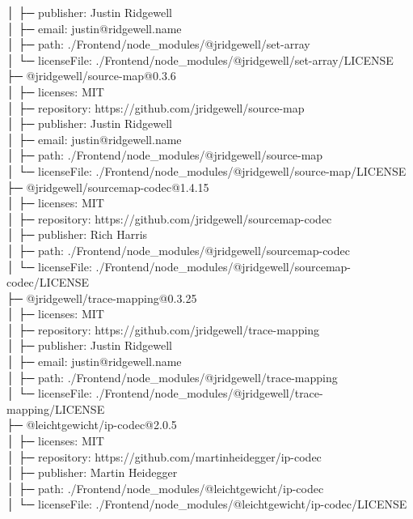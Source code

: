 │  ├─ publisher: Justin Ridgewell\\
│  ├─ email: justin@ridgewell.name\\
│  ├─ path: ./Frontend/node\_modules/@jridgewell/set-array\\
│  └─ licenseFile: ./Frontend/node\_modules/@jridgewell/set-array/LICENSE\\
├─ @jridgewell/source-map@0.3.6\\
│  ├─ licenses: MIT\\
│  ├─ repository: https://github.com/jridgewell/source-map\\
│  ├─ publisher: Justin Ridgewell\\
│  ├─ email: justin@ridgewell.name\\
│  ├─ path: ./Frontend/node\_modules/@jridgewell/source-map\\
│  └─ licenseFile: ./Frontend/node\_modules/@jridgewell/source-map/LICENSE\\
├─ @jridgewell/sourcemap-codec@1.4.15\\
│  ├─ licenses: MIT\\
│  ├─ repository: https://github.com/jridgewell/sourcemap-codec\\
│  ├─ publisher: Rich Harris\\
│  ├─ path: ./Frontend/node\_modules/@jridgewell/sourcemap-codec\\
│  └─ licenseFile: ./Frontend/node\_modules/@jridgewell/sourcemap-codec/LICENSE\\
├─ @jridgewell/trace-mapping@0.3.25\\
│  ├─ licenses: MIT\\
│  ├─ repository: https://github.com/jridgewell/trace-mapping\\
│  ├─ publisher: Justin Ridgewell\\
│  ├─ email: justin@ridgewell.name\\
│  ├─ path: ./Frontend/node\_modules/@jridgewell/trace-mapping\\
│  └─ licenseFile: ./Frontend/node\_modules/@jridgewell/trace-mapping/LICENSE\\
├─ @leichtgewicht/ip-codec@2.0.5\\
│  ├─ licenses: MIT\\
│  ├─ repository: https://github.com/martinheidegger/ip-codec\\
│  ├─ publisher: Martin Heidegger\\
│  ├─ path: ./Frontend/node\_modules/@leichtgewicht/ip-codec\\
│  └─ licenseFile: ./Frontend/node\_modules/@leichtgewicht/ip-codec/LICENSE\\
